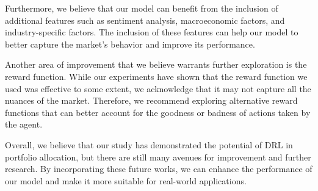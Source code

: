 \documentclass[../xlapes02]{subfiles}
\begin{document}
    Furthermore, we believe that our model can benefit from the inclusion of additional features such as sentiment analysis, macroeconomic factors, and industry-specific factors. The inclusion of these features can help our model to better capture the market's behavior and improve its performance.

    Another area of improvement that we believe warrants further exploration is the reward function. While our experiments have shown that the reward function we used was effective to some extent, we acknowledge that it may not capture all the nuances of the market. Therefore, we recommend exploring alternative reward functions that can better account for the goodness or badness of actions taken by the agent.

    Overall, we believe that our study has demonstrated the potential of DRL in portfolio allocation, but there are still many avenues for improvement and further research. By incorporating these future works, we can enhance the performance of our model and make it more suitable for real-world applications.


\end{document}
